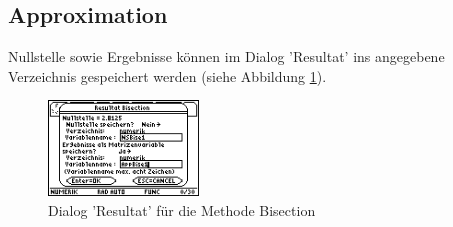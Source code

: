 \documentclass[a5paper,9pt]{scrreprt}
\begin{document}
\newpage
\subsection{Approximation}
Nullstelle sowie Ergebnisse k\"onnen im Dialog 'Resultat’ ins angegebene Verzeichnis gespeichert werden (siehe Abbildung \ref{fig:ResultatApproximationBisection}).
\begin{figure}[h]
  \centering
  \includegraphics[width=4cm]{img/nummeth_image034.png}
  \caption{Dialog 'Resultat’ f\"ur die Methode Bisection}
  \label{fig:ResultatApproximationBisection}
\end{figure}

\end{document}
